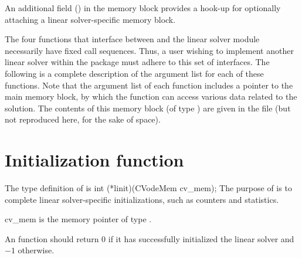 An additional field () in the {\cvodea} memory block
provides a hook-up for optionally attaching a linear solver-specific
memory block.

The four functions that interface between {\cvodes} and the linear solver module
necessarily have fixed call sequences.  Thus, a user wishing to implement another 
linear solver within the {\cvodes} package must adhere to this set of interfaces.
The following is a complete description of the argument list for each of
these functions.  Note that the argument list of each function includes a
pointer to the main {\cvodes} memory block, by which the function can access
various data related to the {\cvodes} solution.  The contents of this memory
block (of type ) are given in the file  
(but not reproduced here, for the sake of space).


\section{Initialization function}
The type definition of  is
{
  int (*linit)(CVodeMem cv\_mem);
}
{
  The purpose of  is to complete linear solver-specific initializations,
  such as counters and statistics.        
}
{
  \begin{args}[cv\_mem]
  \item[cv\_mem]
    is the {\cvodes} memory pointer of type .
  \end{args}
}
{
  An  function should return $0$ if it 
  has successfully initialized the {\cvodes} linear solver and 
  $-1$ otherwise. 
}
{}


